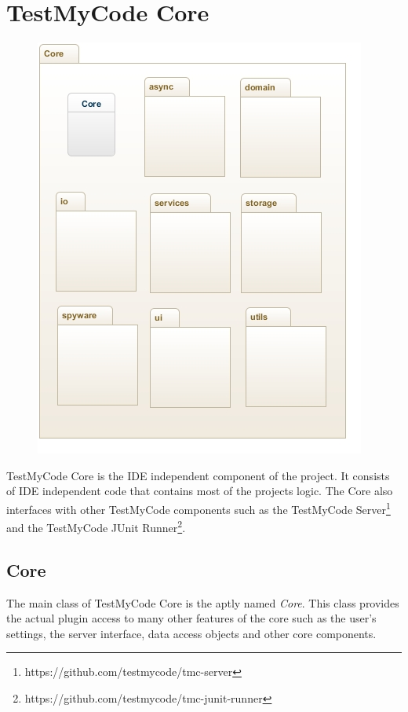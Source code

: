\documentclass[12pt,a4paper,english,leqno]{article}
\begin{document}
\section{TestMyCode Core}

\begin{figure}[ht!]
\centering
\includegraphics[scale=1]{img/core.jpg}
\end{figure}

TestMyCode Core is the IDE independent component of the project. It consists of IDE independent code that contains most of the projects logic. The Core also interfaces with other TestMyCode components such as the TestMyCode Server\footnote{https://github.com/testmycode/tmc-server} and the TestMyCode JUnit Runner\footnote{https://github.com/testmycode/tmc-junit-runner}.

\subsection{Core}

The main class of TestMyCode Core is the aptly named \textit{Core}. This class provides the actual plugin access to many other features of the core such as the user's settings, the server interface, data access objects and other core components.
\end{document}

